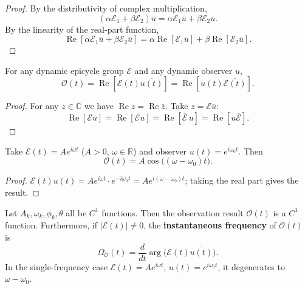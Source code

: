 \begin{proof}
By the distributivity of complex multiplication,
\[
(\alpha\mathcal E_1+\beta\mathcal E_2)\overline u=\alpha\mathcal E_1\overline u+\beta\mathcal E_2\overline u.
\]
By the linearity of the real-part function,
\[
\operatorname{Re}[\alpha\mathcal E_1\overline u+\beta\mathcal E_2\overline u]
=\alpha\operatorname{Re}[\mathcal E_1\overline u]+\beta\operatorname{Re}[\mathcal E_2\overline u].
\]
\end{proof}

\begin{proposition}\label{prop:dyn_projection_symmetry}
For any dynamic epicycle group $\mathcal E$ and any dynamic observer $u$,
\[
\mathcal O(t)=\operatorname{Re}[\mathcal E(t)\overline{u(t)}]
=\operatorname{Re}[u(t)\overline{\mathcal E(t)}].
\]
\end{proposition}

\begin{proof}
For any $z\in\mathbb C$ we have $\operatorname{Re}z=\operatorname{Re}\overline z$. Take $z=\mathcal E\overline u$:
\[
\operatorname{Re}[\mathcal E\overline u]=\operatorname{Re}\overline{[\mathcal E\overline u]}
=\operatorname{Re}[\overline{\mathcal E}\,u]=\operatorname{Re}[u\overline{\mathcal E}].
\]
\end{proof}

\begin{lemma}\label{lem:dyn_single_freq}
Take $\mathcal E(t)=A e^{i\omega t}$ ($A>0$, $\omega\in\mathbb R$) and observer $u(t)=e^{i\omega_0 t}$. Then
\[
\mathcal O(t)=A\cos\big((\omega-\omega_0)t\big).
\]
\end{lemma}

\begin{proof}
$\mathcal E(t)\overline{u(t)}=A e^{i\omega t}\cdot e^{-i\omega_0 t}=A e^{i(\omega-\omega_0)t}$; taking the real part gives the result.
\end{proof}

\begin{theorem}\label{thm:dyn_projection_continuity}
Let $A_k,\omega_k,\phi_k,\theta$ all be $C^1$ functions. Then the observation result $\mathcal O(t)$ is a $C^1$ function. Furthermore, if $|\mathcal E(t)|\neq 0$, the \textbf{instantaneous frequency} of $\mathcal O(t)$ is
\[
\Omega_{\mathcal O}(t)=\frac{d}{dt}\arg\!\big(\mathcal E(t)\overline{u(t)}\big).
\]
In the single-frequency case $\mathcal E(t)=A e^{i\omega t}$, $u(t)=e^{i\omega_0 t}$, it degenerates to $\omega-\omega_0$.
\end{theorem}

